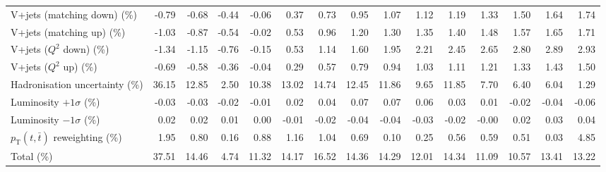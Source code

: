 \begin{table}[htbp]
{\begin{tabular}{lrrrrrrrrrrrrrr}
V+jets (matching down) (\%) & -0.79 & -0.68 & -0.44 & -0.06 & 0.37 & 0.73 & 0.95 & 1.07 & 1.12 & 1.19 & 1.33 & 1.50 & 1.64 & 1.74 \\ 
V+jets (matching up) (\%) & -1.03 & -0.87 & -0.54 & -0.02 & 0.53 & 0.96 & 1.20 & 1.30 & 1.35 & 1.40 & 1.48 & 1.57 & 1.65 & 1.71 \\ 
V+jets ($Q^{2}$ down) (\%) & -1.34 & -1.15 & -0.76 & -0.15 & 0.53 & 1.14 & 1.60 & 1.95 & 2.21 & 2.45 & 2.65 & 2.80 & 2.89 & 2.93 \\ 
V+jets ($Q^{2}$ up) (\%) & -0.69 & -0.58 & -0.36 & -0.04 & 0.29 & 0.57 & 0.79 & 0.94 & 1.03 & 1.11 & 1.21 & 1.33 & 1.43 & 1.50 \\ 
Hadronisation uncertainty (\%) & 36.15 & 12.85 & 2.50 & 10.38 & 13.02 & 14.74 & 12.45 & 11.86 & 9.65 & 11.85 & 7.70 & 6.40 & 6.04 & 1.29 \\ 
Luminosity $+1\sigma$ (\%) & -0.03 & -0.03 & -0.02 & -0.01 & 0.02 & 0.04 & 0.07 & 0.07 & 0.06 & 0.03 & 0.01 & -0.02 & -0.04 & -0.06 \\ 
Luminosity $-1\sigma$ (\%) & 0.02 & 0.02 & 0.01 & 0.00 & -0.01 & -0.02 & -0.04 & -0.04 & -0.03 & -0.02 & -0.00 & 0.02 & 0.03 & 0.04 \\ 
$p_\mathrm{T}(t,\bar{t})$ reweighting (\%) & 1.95 & 0.80 & 0.16 & 0.88 & 1.16 & 1.04 & 0.69 & 0.10 & 0.25 & 0.56 & 0.59 & 0.51 & 0.03 & 4.85 \\ 
\hline 
Total (\%) & 37.51  & 14.46  & 4.74  & 11.32  & 14.17  & 16.52  & 14.36  & 14.29  & 12.01  & 14.34  & 11.09  & 10.57  & 13.41  & 13.22 \\ 
\hline 
\end{tabular}
}
\end{table}
